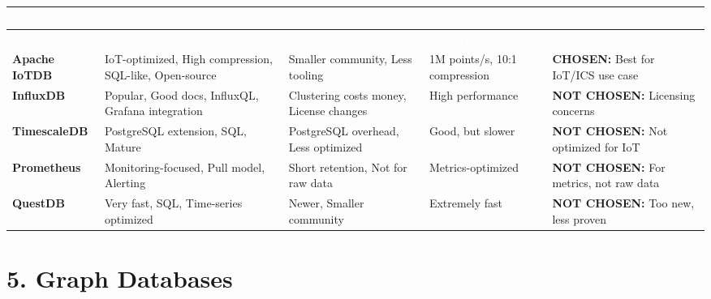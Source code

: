\documentclass[12pt,a4paper,landscape]{article}
\begin{document}
\begin{longtable}{|p{2.5cm}|p{3cm}|p{3cm}|p{3cm}|p{4cm}|}
\hline
\rowcolor{headercolor}
\textcolor{white}{\textbf{Database}} & 
\textcolor{white}{\textbf{Pros}} & 
\textcolor{white}{\textbf{Cons}} & 
\textcolor{white}{\textbf{Performance}} & 
\textcolor{white}{\textbf{Why Chosen/Not}} \\
\hline
\endfirsthead

\hline
\rowcolor{headercolor}
\textcolor{white}{\textbf{Database}} & 
\textcolor{white}{\textbf{Pros}} & 
\textcolor{white}{\textbf{Cons}} & 
\textcolor{white}{\textbf{Performance}} & 
\textcolor{white}{\textbf{Why Chosen/Not}} \\
\hline
\endhead

\rowcolor{rowcolor1}
\textbf{Apache IoTDB} & 
IoT-optimized, High compression, SQL-like, Open-source & 
Smaller community, Less tooling & 
1M points/s, 10:1 compression & 
\textbf{CHOSEN:} Best for IoT/ICS use case \\
\hline

\rowcolor{rowcolor2}
\textbf{InfluxDB} & 
Popular, Good docs, InfluxQL, Grafana integration & 
Clustering costs money, License changes & 
High performance & 
\textbf{NOT CHOSEN:} Licensing concerns \\
\hline

\rowcolor{rowcolor1}
\textbf{TimescaleDB} & 
PostgreSQL extension, SQL, Mature & 
PostgreSQL overhead, Less optimized & 
Good, but slower & 
\textbf{NOT CHOSEN:} Not optimized for IoT \\
\hline

\rowcolor{rowcolor2}
\textbf{Prometheus} & 
Monitoring-focused, Pull model, Alerting & 
Short retention, Not for raw data & 
Metrics-optimized & 
\textbf{NOT CHOSEN:} For metrics, not raw data \\
\hline

\rowcolor{rowcolor1}
\textbf{QuestDB} & 
Very fast, SQL, Time-series optimized & 
Newer, Smaller community & 
Extremely fast & 
\textbf{NOT CHOSEN:} Too new, less proven \\
\hline
\end{longtable}

\section*{5. Graph Databases}
\end{document}
